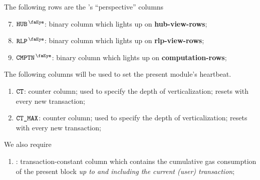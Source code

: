 \noindent The following rows are the \txnDataMod{}'s ``perspective'' columns
\begin{enumerate}\setcounter{enumi}{6}
	\item
		$\isUserTxnHubView$:
		binary column which lights up on \textbf{hub-view-rows};
	\item
		$\isUserTxnRlpView$:
		binary column which lights up on \textbf{rlp-view-rows};
	\item
		$\isUserTxnComputation$:
		binary column which lights up on \textbf{computation-rows};
\end{enumerate}
\noindent The following columns will be used to set the present module's heartbeat.
\begin{enumerate}[resume]
	\item $\texttt{CT}$:
		counter column;
		used to specify the depth of verticalization;
		resets with every new transaction; 
	\item $\texttt{CT\_MAX}$:
		counter column;
		used to specify the depth of verticalization;
		resets with every new transaction; 
\end{enumerate}
We also require
\begin{enumerate}[resume]
	\item \cumulativeConsumedGas:
		transaction-constant column which contains the cumulative gas consumption of the present block
		\emph{up to and including the current (user) transaction};
\end{enumerate}
